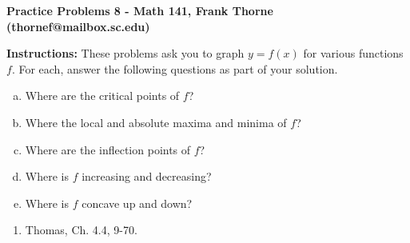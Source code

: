 \documentclass[12pt]{article}
\begin{document}
\setlength{\topmargin}{-2mm}





\begin{center}{\bf Practice Problems 8 - Math 141, Frank Thorne (thornef@mailbox.sc.edu)}

\medskip

\medskip

\end{center}
\vskip -0.1in
{\bf Instructions:} These problems ask you to graph $y = f(x)$ for various functions $f$. For each, 
answer the following questions as part of your solution.

\begin{enumerate}[(a)]
\item Where are the critical points of $f$?
\item Where the local and absolute maxima and minima of $f$?
\item Where are the inflection points of $f$?
\item Where is $f$ increasing and decreasing?
\item Where is $f$ concave up and down? 
\end{enumerate}

\begin{enumerate}
\item
Thomas, Ch. 4.4, 9-70.

\end{enumerate}
\end{document}
